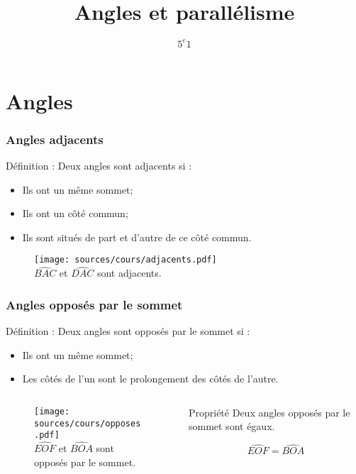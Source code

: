 \documentclass{beamer}
\title{Angles et parallélisme}
\author{$5^{e}1$}
\begin{document}
\frame{\titlepage}

\section{Angles}


\frame{\tableofcontents[sectionstyle=show/shaded, subsectionstyle=show/shaded]}

\begin{frame}
  \frametitle{Angles adjacents}

  \begin{alertblock}{Définition :}	
    Deux angles sont adjacents si :
    \begin{itemize}
    \item Ils ont un même sommet;
    \item Ils ont un côté commun;
    \item Ils sont situés de part et d'autre de ce côté commun.
    \end{itemize}
  \end{alertblock}

  \begin{figure}[H]
    \centering
    \texttt{[image: sources/cours/adjacents.pdf]}
    \\$\widehat{BAC}$ et $\widehat{DAC}$ sont adjacents.
  \end{figure}

\end{frame}

\begin{frame}
  \frametitle{Angles opposés par le sommet}
  \begin{alertblock}{Définition :}	
    Deux angles sont opposés par le sommet si :
    \begin{itemize}
    \item Ils ont un même sommet;
    \item Les côtés de l'un sont le prolongement des côtés de l'autre.
    \end{itemize}
  \end{alertblock}
  \begin{columns}[t]
    \begin{column}{5cm}
      \begin{figure}[H]
        \centering
        \texttt{[image: sources/cours/opposes.pdf]}
        \\$\widehat{EOF}$ et $\widehat{BOA}$ sont opposés par le sommet.    
      \end{figure} 
    \end{column}
    \begin{column}{5cm}
      \begin{block}{Propriété}
        Deux angles opposés par le sommet sont égaux.     
      \end{block}
      $$\widehat{EOF} = \widehat{BOA}$$ 
    \end{column}
  \end{columns} 
\end{frame}
\end{document}
